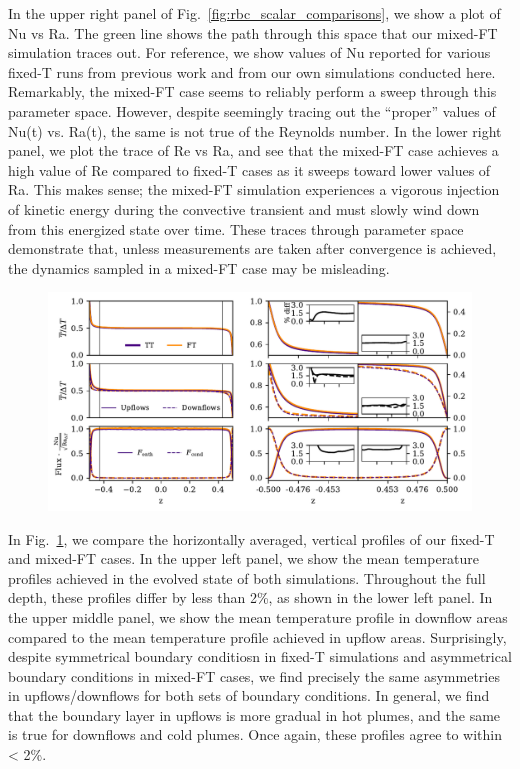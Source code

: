 \documentclass[aps, pre, onecolumn, nofootinbib, notitlepage, groupedaddress, amsfonts, amssymb, amsmath, longbibliography]{revtex4-1}
\begin{document}
In the upper right panel of Fig.~\ref{fig:rbc_scalar_comparisons}, we show a plot of Nu vs Ra.
The green line shows the path through this space that our mixed-FT simulation traces out.
For reference, we show values of Nu reported for various fixed-T runs from previous work and from our own simulations conducted here.
Remarkably, the mixed-FT case seems to reliably perform a sweep through this parameter space.
However, despite seemingly tracing out the ``proper'' values of Nu(t) vs. Ra(t), the same is not true of the Reynolds number.
In the lower right panel, we plot the trace of Re vs Ra, and see that the mixed-FT case achieves a high value of Re compared to fixed-T cases as it sweeps toward lower values of Ra.
This makes sense; the mixed-FT simulation experiences a vigorous injection of kinetic energy during the convective transient and must slowly wind down from this energized state over time.
These traces through parameter space demonstrate that, unless measurements are taken after convergence is achieved, the dynamics sampled in a mixed-FT case may be misleading.

\begin{figure}
\includegraphics[width=\textwidth]{./figs/rbc_1D_profiles.pdf}
\caption{ 
\label{fig:rbc_1D_profiles} }
\end{figure}

In Fig.~\ref{fig:rbc_1D_profiles}, we compare the horizontally averaged, vertical profiles of our fixed-T and mixed-FT cases.
In the upper left panel, we show the mean temperature profiles achieved in the evolved state of both simulations.
Throughout the full depth, these profiles differ by less than 2\%, as shown in the lower left panel.
In the upper middle panel, we show the mean temperature profile in downflow areas compared to the mean temperature profile achieved in upflow areas.
Surprisingly, despite symmetrical boundary conditiosn in fixed-T simulations and asymmetrical boundary conditions in mixed-FT cases, we find precisely the same asymmetries in upflows/downflows for both sets of boundary conditions.
In general, we find that the boundary layer in upflows is more gradual in hot plumes, and the same is true for downflows and cold plumes.
Once again, these profiles agree to within < 2\%.
\end{document}
